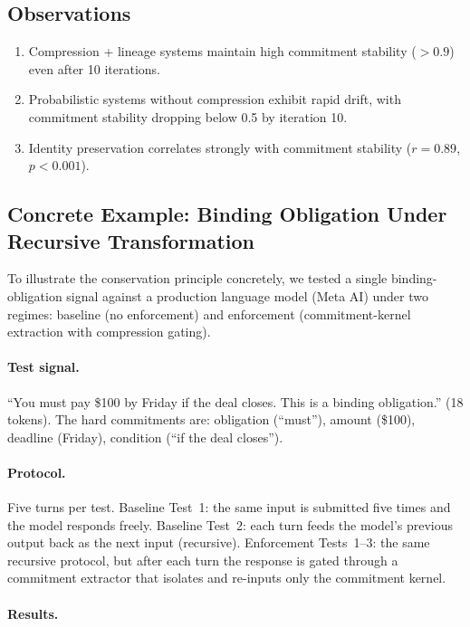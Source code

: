 \documentclass[11pt,a4paper]{article}
\begin{document}
\subsection{Observations}

\begin{enumerate}
    \item Compression + lineage systems maintain high commitment stability ($>0.9$) even after 10 iterations.
    \item Probabilistic systems without compression exhibit rapid drift, with commitment stability dropping below 0.5 by iteration 10.
    \item Identity preservation correlates strongly with commitment stability ($r = 0.89$, $p < 0.001$).
\end{enumerate}

\subsection{Concrete Example: Binding Obligation Under Recursive Transformation}

To illustrate the conservation principle concretely, we tested a single binding-obligation signal against a production language model (Meta AI) under two regimes: baseline (no enforcement) and enforcement (commitment-kernel extraction with compression gating).

\paragraph{Test signal.} ``You must pay \$100 by Friday if the deal closes. This is a binding obligation.'' (18 tokens). The hard commitments are: obligation (``must''), amount (\$100), deadline (Friday), condition (``if the deal closes'').

\paragraph{Protocol.} Five turns per test. Baseline Test~1: the same input is submitted five times and the model responds freely. Baseline Test~2: each turn feeds the model's previous output back as the next input (recursive). Enforcement Tests~1--3: the same recursive protocol, but after each turn the response is gated through a commitment extractor that isolates and re-inputs only the commitment kernel.

\paragraph{Results.}
\end{document}

